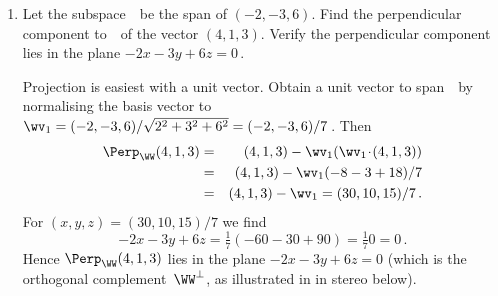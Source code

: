 \begin{example} \label{eg:perpn}
\begin{enumerate}
\item\label{eg:perpn:a} Let the subspace~\WW\ be the span of \((-2,-3,6)\).  
Find the perpendicular component to~\WW\ of the vector \((4,1,3)\).
Verify the perpendicular component lies in the plane \(-2x-3y+6z=0\)\,.
\begin{solution} 
Projection is easiest with a unit vector.
Obtain a unit vector to span~\WW\ by normalising the basis vector to \(\wv_1=(-2,-3,6)/\sqrt{2^2+3^2+6^2}=(-2,-3,6)/7\)\,.
Then
\begin{eqnarray*}
\Perp_\WW(4,1,3)&=&(4,1,3)-\wv_1(\wv_1\cdot(4,1,3))
\\&=&(4,1,3)-\wv_1(-8-3+18)/7
\\&=&(4,1,3)-\wv_1=(30,10,15)/7\,.
\end{eqnarray*}
For \((x,y,z)=(30,10,15)/7\) we find
\begin{equation*}
-2x-3y+6z=\tfrac17(-60-30+90)=\tfrac170=0\,.
\end{equation*}
Hence \(\Perp_\WW(4,1,3)\) lies in the plane \(-2x-3y+6z=0\) (which is the orthogonal complement~\(\WW^\perp\), as illustrated in in stereo below).
\begin{center}
\end{center}
\end{solution}



\end{enumerate}
\end{example}
